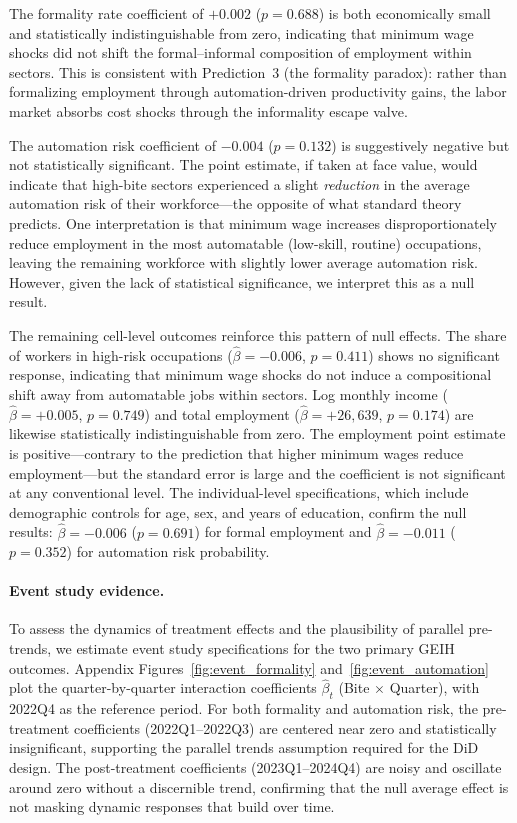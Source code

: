 \documentclass[5p,times,authoryear]{elsarticle}
\begin{document}
The formality rate coefficient of $+0.002$ ($p = 0.688$) is both economically small and statistically indistinguishable from zero, indicating that minimum wage shocks did not shift the formal--informal composition of employment within sectors. This is consistent with Prediction~3 (the formality paradox): rather than formalizing employment through automation-driven productivity gains, the labor market absorbs cost shocks through the informality escape valve.

The automation risk coefficient of $-0.004$ ($p = 0.132$) is suggestively negative but not statistically significant. The point estimate, if taken at face value, would indicate that high-bite sectors experienced a slight \emph{reduction} in the average automation risk of their workforce---the opposite of what standard theory predicts. One interpretation is that minimum wage increases disproportionately reduce employment in the most automatable (low-skill, routine) occupations, leaving the remaining workforce with slightly lower average automation risk. However, given the lack of statistical significance, we interpret this as a null result.

The remaining cell-level outcomes reinforce this pattern of null effects. The share of workers in high-risk occupations ($\hat{\beta} = -0.006$, $p = 0.411$) shows no significant response, indicating that minimum wage shocks do not induce a compositional shift away from automatable jobs within sectors. Log monthly income ($\hat{\beta} = +0.005$, $p = 0.749$) and total employment ($\hat{\beta} = +26{,}639$, $p = 0.174$) are likewise statistically indistinguishable from zero. The employment point estimate is positive---contrary to the prediction that higher minimum wages reduce employment---but the standard error is large and the coefficient is not significant at any conventional level. The individual-level specifications, which include demographic controls for age, sex, and years of education, confirm the null results: $\hat{\beta} = -0.006$ ($p = 0.691$) for formal employment and $\hat{\beta} = -0.011$ ($p = 0.352$) for automation risk probability.

\paragraph{Event study evidence.} To assess the dynamics of treatment effects and the plausibility of parallel pre-trends, we estimate event study specifications for the two primary GEIH outcomes. Appendix Figures~\ref{fig:event_formality} and~\ref{fig:event_automation} plot the quarter-by-quarter interaction coefficients $\hat{\beta}_t$ (Bite $\times$ Quarter), with 2022Q4 as the reference period. For both formality and automation risk, the pre-treatment coefficients (2022Q1--2022Q3) are centered near zero and statistically insignificant, supporting the parallel trends assumption required for the DiD design. The post-treatment coefficients (2023Q1--2024Q4) are noisy and oscillate around zero without a discernible trend, confirming that the null average effect is not masking dynamic responses that build over time.
\end{document}
